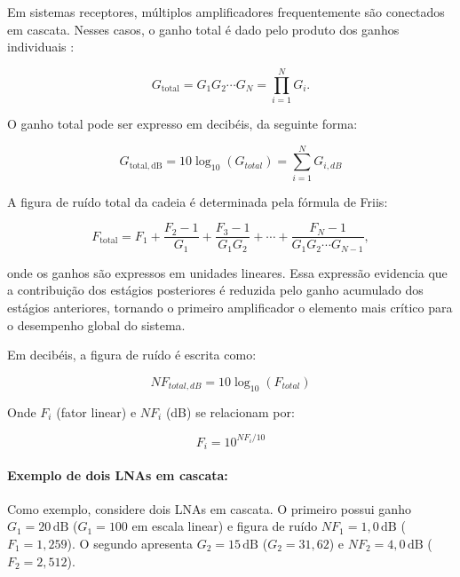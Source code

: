 Em sistemas receptores, múltiplos amplificadores frequentemente são conectados em cascata. Nesses casos, o ganho total é dado pelo produto dos ganhos individuais \cite{pozar2012microwave}:

\begin{equation}
G_{\mathrm{total}} = G_1 G_2 \cdots G_N = \prod_{i=1}^{N}G_i.
\end{equation}

O ganho total pode ser expresso em decibéis, da seguinte forma:

\begin{equation}
   G_{\mathrm{total,dB}} = 10 \log_{10}(G_{total}) = \sum_{i=1}^{N} G_{i,dB} 
\end{equation}


A figura de ruído total da cadeia é determinada pela fórmula de Friis:

\begin{equation}
F_{\mathrm{total}}
=
F_1
+
\frac{F_2-1}{G_1}
+
\frac{F_3-1}{G_1G_2}
+\cdots + \frac{F_N - 1}{G_1 G_2 \cdots G_{N-1}},
\end{equation}

onde os ganhos são expressos em unidades lineares. Essa expressão evidencia que a contribuição dos estágios posteriores é reduzida pelo ganho acumulado dos estágios anteriores, tornando o primeiro amplificador o elemento mais crítico para o desempenho global do sistema.

Em decibéis, a figura de ruído é escrita como:

\begin{equation}
    NF_{total,dB} = 10 \log_{10}(F_{total})
\end{equation}

Onde \( F_i \) (fator linear) e \( NF_i \) (dB) se relacionam por:

\begin{equation}
  F_i = 10^{NF_i / 10}  
\end{equation}


\paragraph{Exemplo de dois LNAs em cascata:}

Como exemplo, considere dois LNAs em cascata. O primeiro possui ganho
$G_1=20\,\mathrm{dB}$ ($G_1=100$ em escala linear) e figura de ruído
$NF_1=1,0\,\mathrm{dB}$ ($F_1=1,259$). O segundo apresenta
$G_2=15\,\mathrm{dB}$ ($G_2=31,62$) e
$NF_2=4,0\,\mathrm{dB}$ ($F_2=2,512$).

